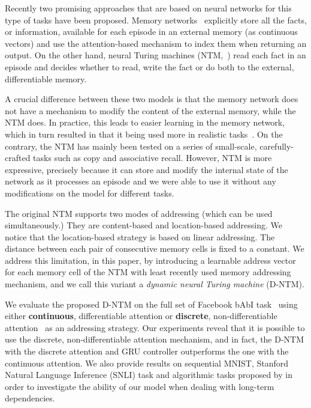 \documentclass[12pt]{article}
\begin{document}
Recently two promising approaches that are based on neural networks for this type of tasks
have been proposed. Memory networks~\citep{weston2014memory} explicitly store all
the facts, or information, available for each episode in an external memory (as
continuous vectors) and use the attention-based mechanism to index them when
returning an output. On the other hand, neural Turing
machines (NTM,~\citep{graves2014neural}) read each fact in an episode and decides
whether to read, write the fact or do both to the external, differentiable memory.

A crucial difference between these two models is that the memory network does
not have a mechanism to modify the content of the external memory, while the NTM
does. In practice, this leads to easier learning in the memory network, which in
turn resulted in that it being used more in realistic tasks~\citep{bordes2015large,dodge2015}.
On the contrary, the NTM has mainly been tested on a series of small-scale,
carefully-crafted tasks such as copy and associative recall. However, NTM is more expressive, precisely 
because it can store and modify the internal state of the network as 
it processes an episode and we were able to use it without any modifications on the model 
for different tasks.


The original NTM supports two modes of addressing (which can be used
simultaneously.) They are content-based and location-based addressing. We notice
that the location-based strategy is based on linear addressing. The distance
between each pair of consecutive memory cells is fixed to a constant. We address
this limitation, in this paper, by introducing a learnable address vector for
each memory cell of the NTM with least recently used memory addressing mechanism, 
and we call this variant a {\it dynamic neural Turing machine} (D-NTM).

We evaluate the proposed D-NTM on the full set of Facebook bAbI
task~\citep{weston2014memory} using either {\bf continuous}, differentiable attention or
{\bf discrete}, non-differentiable attention~\citep{rlntm} as an addressing strategy. Our
experiments reveal that it is possible to use the discrete, non-differentiable
attention mechanism, and in fact, the D-NTM with the discrete attention and GRU controller
outperforms the one with the continuous attention. We also provide results on sequential MNIST, Stanford Natural Language Inference (SNLI)
task and algorithmic tasks proposed by \citep{graves2014neural} in order to 
investigate the ability of our model when dealing with long-term dependencies.
\end{document}
